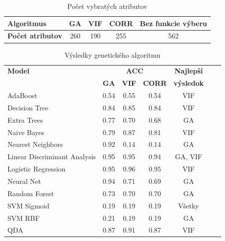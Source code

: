 \documentclass[runningheads]{llncs}
\begin{document}
\begin{table}[]
    \centering
    \caption{Počet vybratých atributov}\label{tab_pocet_vyber_atributov}
    \begin{tabular}{|l|c|c|c|c|}
    \hline
    \textbf{Algoritmus}                  & GA        & VIF         & CORR          & Bez funkcie výberu \\ \hline
    \textbf{Počet atributov}            & 260        & 190         & 255          & 562 \\ \hline
    \end{tabular}
\end{table}



\begin{table}[]
    \centering
    \caption{Výsledky genetického algoritmu}\label{tab_nastavenie_vyhodnotenie_experimentu}
    \begin{tabular}{|l|c|c|c|c|c|c|}   
    \hline
    \textbf{Model}               & \multicolumn{3}{c|}{\textbf{ACC}}                       & \textbf{ Najlepší  } \\ 
                                 & \textbf{GA} & \textbf{VIF} & \textbf{CORR}& \textbf{výsledok}  \\ \hline
    AdaBoost                     & 0.54        & 0.55         & 0.54       & VIF   \\ \hline
    Decision Tree                & 0.84        & 0.85         & 0.84       & VIF     \\ \hline
    Extra Trees                  & 0.77        & 0.70         & 0.68       & GA       \\ \hline
    Naive Bayes                  & 0.79        & 0.87         & 0.81       & VIF        \\ \hline
    Nearest Neighbors            & 0.92        & 0.14         & 0.14       & GA            \\ \hline
    Linear Discriminant Analysis & 0.95        & 0.95         & 0.94       & GA, VIF              \\ \hline
    Logistic Regression          & 0.95        & 0.96         & 0.95       & VIF         \\ \hline
    Neural Net                   & 0.94        & 0.71         & 0.69       & GA           \\ \hline
    Random Forest                & 0.73        & 0.70         & 0.70       & GA              \\ \hline
    SVM Sigmoid                  & 0.19        & 0.19         & 0.19       & Všetky         \\ \hline
    SVM RBF                      & 0.21        & 0.19         & 0.19       & GA           \\ \hline
    QDA                          & 0.87        & 0.91         & 0.87       & VIF           \\ \hline
    \end{tabular}
\end{table}
\end{document}

